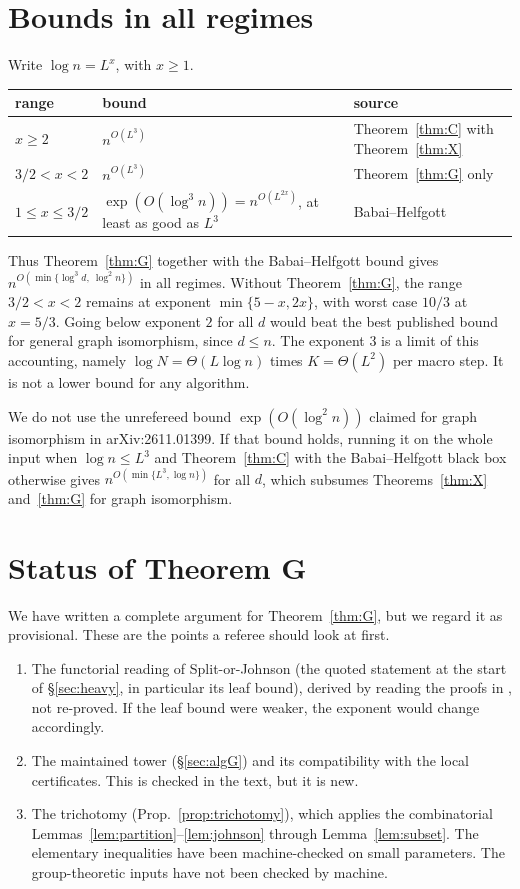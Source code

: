\documentclass[11pt]{article}
\theoremstyle{definition}
\theoremstyle{remark}
\begin{document}
\section{Bounds in all regimes}\label{sec:regimes}

Write $\log n=L^x$, with $x\ge 1$.

\medskip
\noindent\begin{tabularx}{\linewidth}{@{}lXl@{}}
\toprule
range & bound & source\\
\midrule
$x\ge2$ & $n^{O(L^3)}$ & Theorem~\ref{thm:C} with Theorem~\ref{thm:X}\\
$3/2<x<2$ & $n^{O(L^3)}$ & Theorem~\ref{thm:G} only\\
$1\le x\le3/2$ & $\exp(O(\log^3 n))=n^{O(L^{2x})}$, at least as good as $L^3$ & Babai--Helfgott \cite{HBD}\\
\bottomrule
\end{tabularx}
\medskip

Thus Theorem~\ref{thm:G} together with the Babai--Helfgott bound gives $n^{O(\min\{\log^3d,\ \log^2n\})}$ in all regimes. Without Theorem~\ref{thm:G}, the range $3/2<x<2$ remains at exponent $\min\{5-x,2x\}$, with worst case $10/3$ at $x=5/3$. Going below exponent $2$ for all $d$ would beat the best published bound for general graph isomorphism, since $d\le n$. The exponent $3$ is a limit of this accounting, namely $\log N=\Theta(L\log n)$ times $K=\Theta(L^2)$ per macro step. It is not a lower bound for any algorithm.

We do not use the unrefereed bound $\exp(O(\log^2 n))$ claimed for graph isomorphism in arXiv:2611.01399. If that bound holds, running it on the whole input when $\log n\le L^3$ and Theorem~\ref{thm:C} with the Babai--Helfgott black box otherwise gives $n^{O(\min\{L^3,\log n\})}$ for all $d$, which subsumes Theorems~\ref{thm:X} and~\ref{thm:G} for graph isomorphism.

\section{Status of Theorem G}\label{sec:status}

We have written a complete argument for Theorem~\ref{thm:G}, but we regard it as provisional. These are the points a referee should look at first.

\begin{enumerate}
\item The functorial reading of Split-or-Johnson (the quoted statement at the start of \S\ref{sec:heavy}, in particular its leaf bound), derived by reading the proofs in \cite{HBD}, not re-proved. If the leaf bound were weaker, the exponent would change accordingly.
\item The maintained tower (\S\ref{sec:algG}) and its compatibility with the local certificates. This is checked in the text, but it is new.
\item The trichotomy (Prop.~\ref{prop:trichotomy}), which applies the combinatorial Lemmas~\ref{lem:partition}--\ref{lem:johnson} through Lemma~\ref{lem:subset}. The elementary inequalities have been machine-checked on small parameters. The group-theoretic inputs have not been checked by machine.
\end{enumerate}
\end{document}
